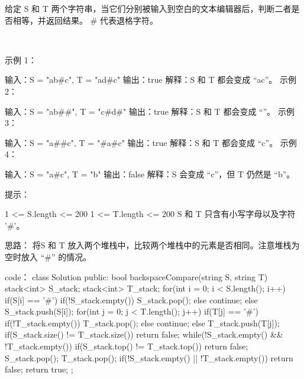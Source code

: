 给定 S 和 T 两个字符串，当它们分别被输入到空白的文本编辑器后，判断二者是否相等，并返回结果。 # 代表退格字符。

 

示例 1：

输入：S = "ab#c", T = "ad#c"
输出：true
解释：S 和 T 都会变成 “ac”。
示例 2：

输入：S = "ab##", T = "c#d#"
输出：true
解释：S 和 T 都会变成 “”。
示例 3：

输入：S = "a##c", T = "#a#c"
输出：true
解释：S 和 T 都会变成 “c”。
示例 4：

输入：S = "a#c", T = "b"
输出：false
解释：S 会变成 “c”，但 T 仍然是 “b”。
 

提示：

1 <= S.length <= 200
1 <= T.length <= 200
S 和 T 只含有小写字母以及字符 '#'。



























思路：
将S 和 T 放入两个堆栈中，比较两个堆栈中的元素是否相同。注意堆栈为空时放入 “#” 的情况。



























code：
class Solution {
public:
    bool backspaceCompare(string S, string T) {
        stack<int> S_stack;
        stack<int> T_stack;
        for(int i = 0; i < S.length(); i++)
        {
            if(S[i] == '#')
            {
                if(!S_stack.empty()) S_stack.pop();
                else continue;
            }       
            else S_stack.push(S[i]);
        }
        for(int j = 0; j < T.length(); j++)
        {
            if(T[j] == '#')
            {
                if(!T_stack.empty()) T_stack.pop();
                else continue;
            }  
            else T_stack.push(T[j]);
        }
        if(S_stack.size() != T_stack.size()) return false;
        while(!S_stack.empty() && !T_stack.empty())
        {
            if(S_stack.top() != T_stack.top())
                return false;
            S_stack.pop();
            T_stack.pop();
        }
        if(!S_stack.empty() || !T_stack.empty())
            return false;
        return true;
    }
};